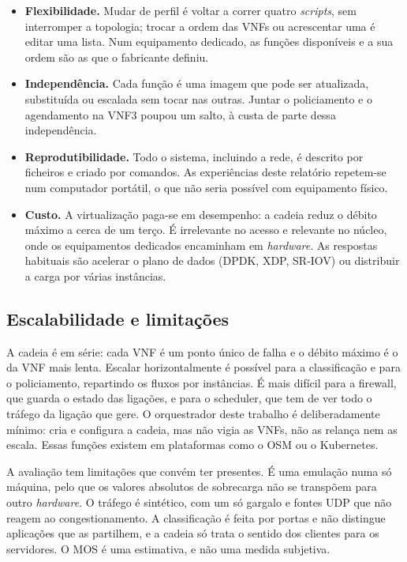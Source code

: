 \documentclass[a4paper]{llncs}
\begin{document}
\begin{itemize}
\item \textbf{Flexibilidade.} Mudar de perfil é voltar a correr quatro \emph{scripts},
sem interromper a topologia; trocar a ordem das VNFs ou acrescentar uma é editar uma
lista.
Num equipamento dedicado, as funções disponíveis e a sua ordem são as que o
fabricante definiu.
\item \textbf{Independência.} Cada função é uma imagem que pode ser atualizada,
substituída ou escalada sem tocar nas outras. Juntar o policiamento e o agendamento
na VNF3 poupou um salto, à custa de parte dessa independência.
\item \textbf{Reprodutibilidade.} Todo o sistema, incluindo a rede, é descrito por
ficheiros e criado por comandos. As experiências deste relatório repetem-se num
computador portátil, o que não seria possível com equipamento físico.
\item \textbf{Custo.} A virtualização paga-se em desempenho: a cadeia reduz o débito
máximo a cerca de um terço. É irrelevante no acesso e relevante no núcleo, onde os
equipamentos dedicados encaminham em \emph{hardware}. As respostas habituais são
acelerar o plano de dados (DPDK, XDP, SR-IOV) ou distribuir a carga por várias
instâncias.
\end{itemize}

\subsection{Escalabilidade e limitações}

A cadeia é em série: cada VNF é um ponto único de falha e o débito máximo é o da VNF
mais lenta. Escalar horizontalmente é possível para a classificação e para o
policiamento, repartindo os fluxos por instâncias. É mais difícil para a firewall,
que guarda o estado das ligações, e para o scheduler, que tem de ver todo o tráfego
da ligação que gere. O orquestrador deste trabalho é deliberadamente mínimo: cria e
configura a cadeia, mas não vigia as VNFs, não as relança nem as escala. Essas
funções existem em plataformas como o OSM ou o Kubernetes.

A avaliação tem limitações que convém ter presentes. É uma emulação numa só máquina,
pelo que os valores absolutos de sobrecarga não se transpõem para outro
\emph{hardware}. O tráfego é sintético, com um só gargalo e fontes UDP que não reagem
ao congestionamento. A classificação é feita por portas e não distingue aplicações
que as partilhem, e a cadeia só trata o sentido dos clientes para os servidores. O MOS
é uma estimativa, e não uma medida subjetiva.
\end{document}
